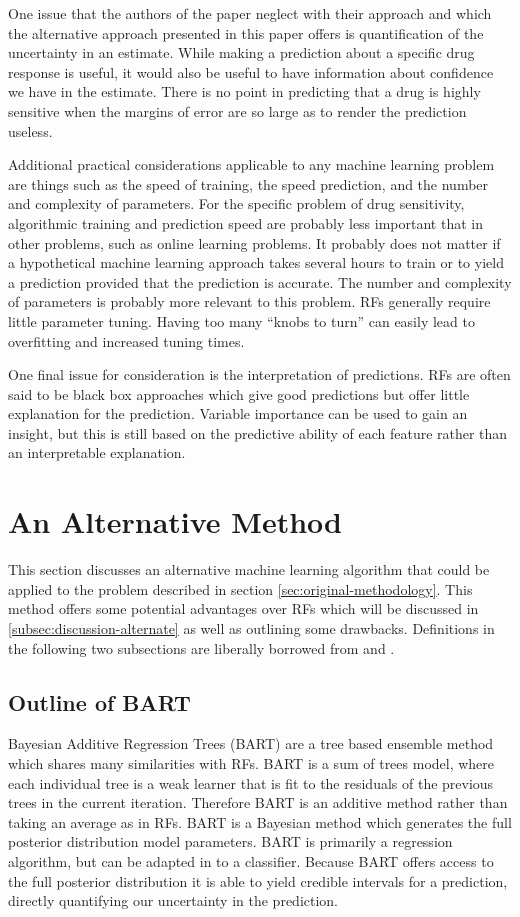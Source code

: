 \documentclass[journal]{IEEEtran}
\begin{document}
One issue that the authors of the paper neglect with their approach and which the alternative approach presented in this paper offers is quantification of the uncertainty in an estimate. While making a prediction about a specific drug response is useful, it would also be useful to have information about confidence we have in the estimate. There is no point in predicting that a drug is highly sensitive when the margins of error are so large as to render the prediction useless.

Additional practical considerations applicable to any machine learning problem are things such as the speed of training, the speed prediction, and the number and complexity of parameters. For the specific problem of drug sensitivity, algorithmic training and prediction speed are probably less important that in other problems, such as online learning problems. It probably does not matter if a hypothetical machine learning approach takes several hours to train or to yield a prediction provided that the prediction is accurate. The number and complexity of parameters is probably more relevant to this problem. RFs generally require little parameter tuning. Having too many ``knobs to turn'' can easily lead to overfitting and increased tuning times.

One final issue for consideration is the interpretation of predictions. RFs are often said to be black box approaches which give good predictions but offer little explanation for the prediction. Variable importance can be used to gain an insight, but this is still based on the predictive ability of each feature rather than an interpretable explanation.

\section{An Alternative Method}
\label{sec:alternate-method}
This section discusses an alternative machine learning algorithm that could be applied to the problem described in section \ref{sec:original-methodology}. This method offers some potential advantages over RFs which will be discussed in \ref{subsec:discussion-alternate} as well as outlining some drawbacks. Definitions in the following two subsections are liberally borrowed from \cite{hernandez2015bayesian} and \cite{chipman2010bart}.

\subsection{Outline of BART}
Bayesian Additive Regression Trees (BART) \cite{chipman2010bart} are a tree based ensemble method which shares many similarities with RFs. BART is a sum of trees model, where each individual tree is a weak learner that is fit to the residuals of the previous trees in the current iteration. Therefore BART is an additive method rather than taking an average as in RFs. BART is a Bayesian method which generates the full posterior distribution model parameters. BART is primarily a regression algorithm, but can be adapted in to a classifier. Because BART offers access to the full posterior distribution it is able to yield credible intervals for a prediction, directly quantifying our uncertainty in the prediction. 
\end{document}
